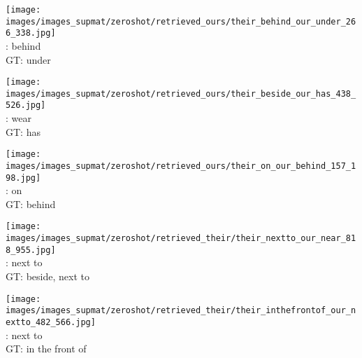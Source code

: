 \documentclass[10pt,twocolumn,letterpaper]{article}
\begin{document}
\begin{figure*}[t]
\begin{minipage}[t]{0.185\textwidth}
    	\centering
       	\texttt{[image: images/images\_supmat/zeroshot/retrieved\_ours/their\_behind\_our\_under\_266\_338.jpg]}\\
       	\vspace{0.3ex}
       	\cite{Lu16}: behind \\
       	GT: under
       	\vspace{2ex}
    \end{minipage}
    \hspace{0.005\textwidth}
\begin{minipage}[t]{0.185\textwidth}
    	\centering
       	\texttt{[image: images/images\_supmat/zeroshot/retrieved\_ours/their\_beside\_our\_has\_438\_526.jpg]}\\
       	\vspace{0.3ex}
       	\cite{Lu16}: wear \\
       	GT: has
       	\vspace{0.2ex}
    \end{minipage}
    \hspace{0.005\textwidth}
\begin{minipage}[t]{0.185\textwidth}
       \centering
       \texttt{[image: images/images\_supmat/zeroshot/retrieved\_ours/their\_on\_our\_behind\_157\_198.jpg]}\\
       \vspace{0.3ex}
       \cite{Lu16}: on \\
       GT: behind
       \vspace{0.2ex}
    \end{minipage}
    \hspace{0.005\textwidth}
\begin{minipage}[t]{0.185\textwidth}
    	\centering
       	\texttt{[image: images/images\_supmat/zeroshot/retrieved\_their/their\_nextto\_our\_near\_818\_955.jpg]}\\
       	\vspace{0.3ex}
       	\cite{Lu16}: next to \\
       	GT: beside, next to
       	\vspace{0.2ex}
    \end{minipage}
    \hspace{0.005\textwidth}  
\begin{minipage}[t]{0.185\textwidth}
    	\centering
       	\texttt{[image: images/images\_supmat/zeroshot/retrieved\_their/their\_inthefrontof\_our\_nextto\_482\_566.jpg]}\\
		\vspace{0.3ex}       	
       	\cite{Lu16}: next to \\
       	GT: in the front of
      	\vspace{0.2ex}
    \end{minipage} 


\end{figure*}
\end{document}

